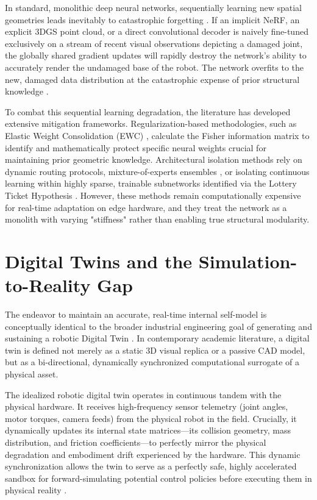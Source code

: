 \documentclass[12pt,a4paper,oneside]{report}
\begin{document}
In standard, monolithic deep neural networks, sequentially learning new spatial geometries leads inevitably to catastrophic forgetting \cite{mccloskey1989catastrophic, french1999catastrophic}. If an implicit NeRF, an explicit 3DGS point cloud, or a direct convolutional decoder is naively fine-tuned exclusively on a stream of recent visual observations depicting a damaged joint, the globally shared gradient updates will rapidly destroy the network's ability to accurately render the undamaged base of the robot. The network overfits to the new, damaged data distribution at the catastrophic expense of prior structural knowledge \cite{kirkpatrick2017overcoming}.

To combat this sequential learning degradation, the literature has developed extensive mitigation frameworks. Regularization-based methodologies, such as Elastic Weight Consolidation (EWC) \cite{kirkpatrick2017overcoming}, calculate the Fisher information matrix to identify and mathematically protect specific neural weights crucial for maintaining prior geometric knowledge. Architectural isolation methods rely on dynamic routing protocols, mixture-of-experts ensembles \cite{mocanu2018scalable}, or isolating continuous learning within highly sparse, trainable subnetworks identified via the Lottery Ticket Hypothesis \cite{frankle2018lottery}. However, these methods remain computationally expensive for real-time adaptation on edge hardware, and they treat the network as a monolith with varying "stiffness" rather than enabling true structural modularity.

\section{Digital Twins and the Simulation-to-Reality Gap}
\label{sec:digital_twins}

The endeavor to maintain an accurate, real-time internal self-model is conceptually identical to the broader industrial engineering goal of generating and sustaining a robotic Digital Twin \cite{jiang2024digitaltwin, mari2024digitaltwin}. In contemporary academic literature, a digital twin is defined not merely as a static 3D visual replica or a passive CAD model, but as a bi-directional, dynamically synchronized computational surrogate of a physical asset.

The idealized robotic digital twin operates in continuous tandem with the physical hardware. It receives high-frequency sensor telemetry (joint angles, motor torques, camera feeds) from the physical robot in the field. Crucially, it dynamically updates its internal state matrices—its collision geometry, mass distribution, and friction coefficients—to perfectly mirror the physical degradation and embodiment drift experienced by the hardware. This dynamic synchronization allows the twin to serve as a perfectly safe, highly accelerated sandbox for forward-simulating potential control policies before executing them in physical reality \cite{sun2026digitaltwin, murugesan2024digitaltwin}.
\end{document}
